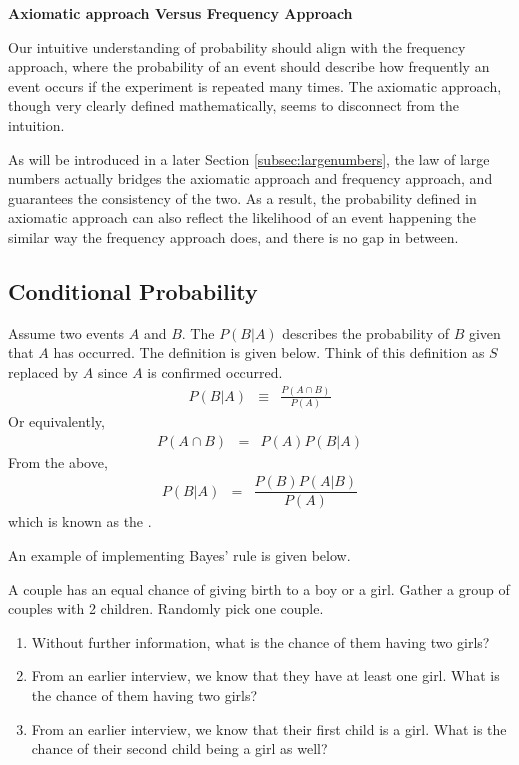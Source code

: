 \begin{mdframed}
\noindent \textbf{Axiomatic approach Versus Frequency Approach}

Our intuitive understanding of probability should align with the frequency approach, where the probability of an event should describe how frequently an event occurs if the experiment is repeated many times. The axiomatic approach, though very clearly defined mathematically, seems to disconnect from the intuition.

As will be introduced in a later Section \ref{subsec:largenumbers}, the law of large numbers actually bridges the axiomatic approach and frequency approach, and guarantees the consistency of the two. As a result, the probability defined in axiomatic approach can also reflect the likelihood of an event happening the similar way the frequency approach does, and there is no gap in between.

\end{mdframed}

\subsection{Conditional Probability}

Assume two events $A$ and $B$. The  $P(B|A)$ describes the probability of $B$ given that $A$ has occurred. The definition is given below. Think of this definition as $S$ replaced by $A$ since $A$ is confirmed occurred.
\begin{eqnarray}
  P(B|A) &\equiv& \frac{P(A\cap B)}{P(A)} \nonumber
\end{eqnarray}
Or equivalently,
\begin{eqnarray}
  P(A\cap B) &=& P(A)P(B|A) \nonumber
\end{eqnarray}
From the above,
\begin{eqnarray}
  P(B|A) &=& \dfrac{P(B)P(A|B)}{P(A)} \nonumber
\end{eqnarray}
which is known as the .

An example of implementing Bayes' rule is given below.

\begin{shortbox}

A couple has an equal chance of giving birth to a boy or a girl. Gather a group of couples with 2 children. Randomly pick one couple.

\begin{enumerate}
	\item Without further information, what is the chance of them having two girls?
	\item From an earlier interview, we know that they have at least one girl. What is the chance of them having two girls?
	\item From an earlier interview, we know that their first child is a girl. What is the chance of their second child being a girl as well?
\end{enumerate}

\end{shortbox}

